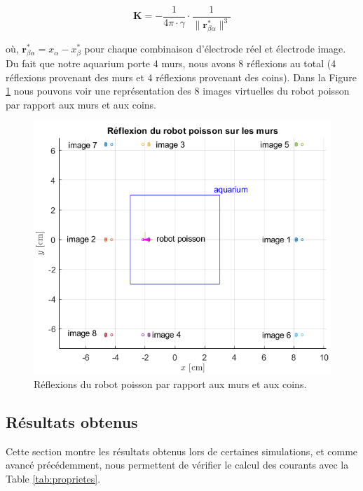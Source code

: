 \begin{equation}
    \mathbf{K} = - \frac{1}{4\pi \cdot \gamma} \cdot \frac{1}{\lVert \mathbf{r}_{\beta\alpha}^* \rVert^3}
\end{equation}

où, $\mathbf{r}_{\beta\alpha}^* = x_\alpha - x_\beta^*$ pour chaque combinaison d'électrode réel et électrode image. Du fait que notre aquarium porte 4 murs, nous avons 8 réflexions au total (4 réflexions provenant des murs et 4 réflexions provenant des coins). Dans la Figure \ref{fig:wall_reflexion} nous pouvons voir une représentation des 8 images virtuelles du robot poisson par rapport aux murs et aux coins. 

\begin{figure}
    \centering
    \includegraphics[scale=0.8]{assets/wall_reflexions/wall_reflexion.png}
    \caption{Réflexions du robot poisson par rapport aux murs et aux coins.}
    \label{fig:wall_reflexion}
\end{figure}
\clearpage

\subsection{Résultats obtenus}
Cette section montre les résultats obtenus lors de certaines simulations, et comme avancé précédemment, nous permettent de vérifier le calcul des courants avec la Table \ref{tab:proprietes}. 
